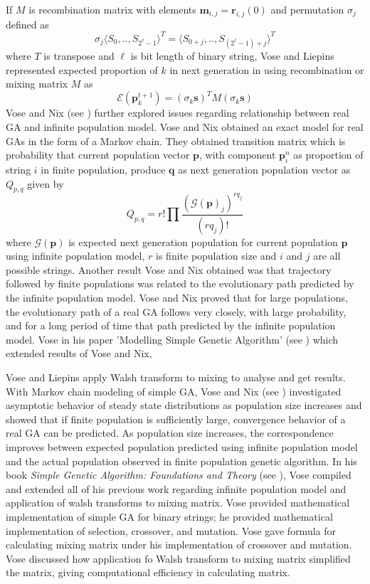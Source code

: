 If $M$ is recombination matrix with elements $\bm{m}_{i,j} = \bm{r}_{i,j}(0)$ and permutation $\sigma_j$ defined as 
\[
\sigma_j{\langle S_0,..,S_{2^\ell - 1} \rangle}^{T} = {\langle S_{0+j},..,S_{(2^\ell - 1)+j} \rangle}^{T}
\]
where $T$ is transpose and $\ell$ is bit length of binary string, Vose and Liepins represented expected proportion 
of $k$ in next generation in using recombination or mixing matrix $M$ as
\[
\mathcal{E}(\bm{p}_k^{t+1}) = (\sigma_k \bm{s})^T M (\sigma_k \bm{s})
\]
Vose and Nix (see \cite{Nix1992}) further explored issues regarding relationship between real GA and infinite population model. 
Vose and Nix obtained an exact model for real GAs in the form of a Markov chain. They obtained transition matrix which is probability that current population vector $\bm{p}$, with 
component $\bm{p}_i^n$ as proportion of string $i$ in finite population, produce $\bm{q}$ as next generation population vector as $Q_{p,q}$ given by
\[
Q_{p,q} = r! \prod \frac{(\mathcal{G}(\bm{p})_j)^{rq_j}}{(rq_j)!}
\]
where $\mathcal{G}(\bm{p})$ is expected next generation population for current population $\bm{p}$ using infinite population model, $r$ is finite population size 
and $i$ and $j$ are all possible strings.
Another result Vose and Nix obtained was that trajectory followed by finite populations was related to the evolutionary path predicted by the infinite population model. 
Vose and Nix proved that for large populations, the evolutionary path of a real GA follows very closely, with large probability, and for a long period of time that path predicted by 
the infinite population model. Vose in his paper 'Modelling Simple Genetic Algorithm' (see \cite{Vose1993}) which extended results of Vose and Nix,

Vose and Liepins apply Walsh transform to mixing to analyse and get results. 
With Markov chain modeling of simple GA, Vose and Nix (see \cite{Nix1992}) investigated asymptotic behavior of steady 
state distributions as population size increases and showed that if finite population is sufficiently large, 
convergence behavior of a real GA can be predicted. As population size increases, the correspondence improves 
between expected population predicted using infinite population model and the actual population observed in 
finite population genetic algorithm. In his book \textit{Simple Genetic Algorithm: Foundations and Theory} (see \cite{Vose1999}), Vose compiled and extended all of his previous work regarding infinite population model and application of walsh transforms to mixing matrix. Vose provided mathematical implementation of simple GA for binary strings; he provided mathematical implementation of selection, crossover, and mutation. Vose gave formula for calculating mixing matrix under his implementation of crossover and mutation. Vose discussed how application fo Walsh transform to mixing matrix simplified the matrix, giving computational efficiency in calculating matrix.

